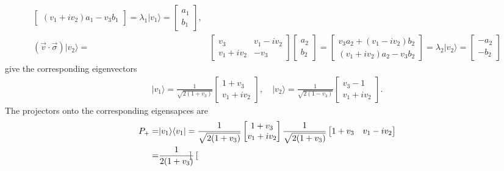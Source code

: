 \documentclass[en]{sol-man}
\begin{document}
\begin{pf}
\begin{align}
\begin{bmatrix}
            (v_1+iv_2)a_1-v_3b_1
        \end{bmatrix}=\lambda_1\lvert v_1\rangle=\begin{bmatrix}
            a_1\\
            b_1
        \end{bmatrix},\\
        (\vec{v}\cdot\vec{\sigma})\lvert v_2\rangle=&\begin{bmatrix}
            v_3&v_1-iv_2\\
            v_1+iv_2&-v_3
        \end{bmatrix}\begin{bmatrix}
            a_2\\
            b_2
        \end{bmatrix}=\begin{bmatrix}
            v_3a_2+(v_1-iv_2)b_2\\
            (v_1+iv_2)a_2-v_3b_2
        \end{bmatrix}=\lambda_2\lvert v_2\rangle=\begin{bmatrix}
            -a_2\\
            -b_2
        \end{bmatrix}
    \end{align}
    give the corresponding eigenvectors
    \begin{align}
        \lvert v_1\rangle=\frac{1}{\sqrt{2(1+v_3)}}\begin{bmatrix}
            1+v_3\\
            v_1+iv_2
        \end{bmatrix},\quad\lvert v_2\rangle=\frac{1}{\sqrt{2(1-v_3)}}\begin{bmatrix}
            v_3-1\\
            v_1+iv_2
        \end{bmatrix}.
    \end{align}
    The projectors onto the corresponding eigensapces are
    \begin{align}
        \notag P_+=&\lvert v_1\rangle\langle v_1\rvert=\frac{1}{\sqrt{2(1+v_3)}}\begin{bmatrix}
            1+v_3\\
            v_1+iv_2
        \end{bmatrix}\frac{1}{\sqrt{2(1+v_3)}}\begin{bmatrix}
            1+v_3&v_1-iv_2
        \end{bmatrix}\\
        \notag=&\frac{1}{2(1+v_3)}\begin{bmatrix}

\end{bmatrix}
\end{align}
\end{pf}
\end{document}
